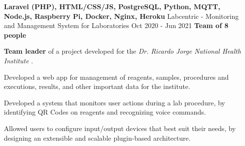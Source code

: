  \cventry
    {\textbf{Laravel (PHP), HTML/CSS/JS, PostgreSQL, Python, MQTT, Node.js, Raspberry Pi, Docker, Nginx, Heroku}} %
    {Labcentric - Monitoring and Management System for Laboratories \href{https://laboratorio-4.herokuapp.com/}{\faExternalLink}} %
    {Oct 2020 - Jun 2021} %
    {\textbf{Team of 8 people}} %
    {
      \begin{cvitems} %
        \item {\textbf{Team leader} of a project developed for the \textit{Dr. Ricardo Jorge National Health Institute} \href{http://www.insa.pt}{\faExternalLink}.}
        \item {Developed a web app for management of reagents, samples, procedures and executions, results, and other important data for the institute.}
        \item {Developed a system that monitors user actions during a lab procedure, by identifying QR Codes on reagents and recognizing voice commands.}
        \item {Allowed users to configure input/output devices that best suit their needs, by designing an extensible and scalable plugin-based architecture.}
      \end{cvitems}
    }
